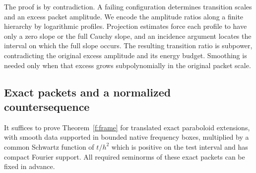 The proof is by contradiction. A failing configuration determines
transition scales and an excess packet amplitude. We encode the
amplitude ratios along a finite hierarchy by logarithmic profiles.
Projection estimates force each profile to have only a zero slope or
the full Cauchy slope, and an incidence argument locates the interval
on which the full slope occurs. The resulting transition ratio is
subpower, contradicting the original excess amplitude and its energy
budget. Smoothing is needed only when that excess grows
subpolynomially in the original packet scale.

\subsection{Exact packets and a normalized countersequence}

\begin{lemma}\label{f:exact}
It suffices to prove Theorem~\ref{f:frame} for translated exact
paraboloid extensions, with smooth data supported in bounded native
frequency boxes, multiplied by a common Schwartz function of $t/h^2$
which is positive on the test interval and has compact Fourier support.
All required seminorms of these exact packets can be fixed in advance.
\end{lemma}

